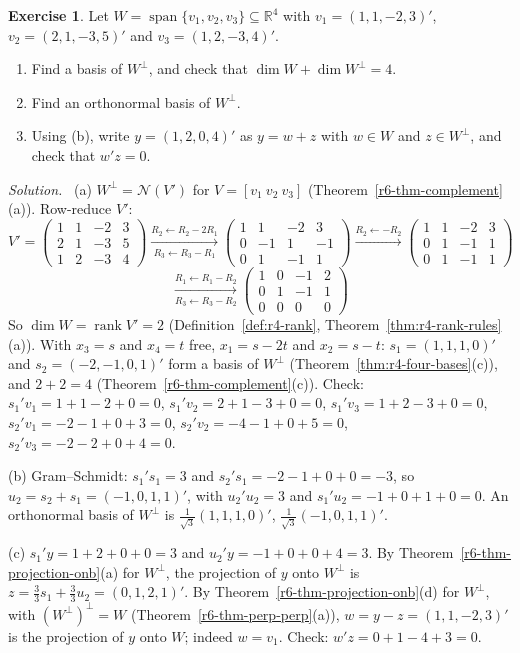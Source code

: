 \documentclass[12pt]{article}
\newcommand{\R}{\mathbb R}
\DeclareMathOperator{\rank}{rank}
\DeclareMathOperator{\Span}{span}
\theoremstyle{definition}
\newtheorem{exercise}{Exercise}
\newenvironment{solution}{\par\noindent\textit{Solution.}\ }{\par\smallskip}
\begin{document}
\begin{exercise}\label{r6-dr-complement}
Let \(W=\Span\{v_1,v_2,v_3\}\subseteq\R^4\) with \(v_1=(1,1,-2,3)'\), \(v_2=(2,1,-3,5)'\) and \(v_3=(1,2,-3,4)'\).
\begin{enumerate}
\item Find a basis of \(W^\perp\), and check that \(\dim W+\dim W^\perp=4\).
\item Find an orthonormal basis of \(W^\perp\).
\item Using (b), write \(y=(1,2,0,4)'\) as \(y=w+z\) with \(w\in W\) and \(z\in W^\perp\), and check that
\(w'z=0\).
\end{enumerate}
\end{exercise}
\begin{solution}
(a) \(W^\perp=\mathcal N(V')\) for \(V=[v_1\ v_2\ v_3]\) (Theorem~\ref{r6-thm-complement}(a)). Row-reduce \(V'\):
\[
V'=\begin{pmatrix}1&1&-2&3\\2&1&-3&5\\1&2&-3&4\end{pmatrix}
\xrightarrow[R_3\leftarrow R_3-R_1]{R_2\leftarrow R_2-2R_1}
\begin{pmatrix}1&1&-2&3\\0&-1&1&-1\\0&1&-1&1\end{pmatrix}
\xrightarrow{R_2\leftarrow-R_2}
\begin{pmatrix}1&1&-2&3\\0&1&-1&1\\0&1&-1&1\end{pmatrix}
\]
\[
\xrightarrow[R_3\leftarrow R_3-R_2]{R_1\leftarrow R_1-R_2}
\begin{pmatrix}1&0&-1&2\\0&1&-1&1\\0&0&0&0\end{pmatrix}
\]
So \(\dim W=\rank V'=2\) (Definition~\ref{def:r4-rank}, Theorem~\ref{thm:r4-rank-rules}(a)). With \(x_3=s\) and
\(x_4=t\) free, \(x_1=s-2t\) and \(x_2=s-t\): \(s_1=(1,1,1,0)'\) and \(s_2=(-2,-1,0,1)'\) form a basis of \(W^\perp\)
(Theorem~\ref{thm:r4-four-bases}(c)), and \(2+2=4\) (Theorem~\ref{r6-thm-complement}(c)). Check:
\(s_1'v_1=1+1-2+0=0\), \(s_1'v_2=2+1-3+0=0\), \(s_1'v_3=1+2-3+0=0\), \(s_2'v_1=-2-1+0+3=0\), \(s_2'v_2=-4-1+0+5=0\),
\(s_2'v_3=-2-2+0+4=0\).

(b) Gram--Schmidt: \(s_1's_1=3\) and \(s_2's_1=-2-1+0+0=-3\), so \(u_2=s_2+s_1=(-1,0,1,1)'\), with
\(u_2'u_2=3\) and \(s_1'u_2=-1+0+1+0=0\). An orthonormal basis of \(W^\perp\) is
\(\frac1{\sqrt3}(1,1,1,0)'\), \(\frac1{\sqrt3}(-1,0,1,1)'\).

(c) \(s_1'y=1+2+0+0=3\) and \(u_2'y=-1+0+0+4=3\). By Theorem~\ref{r6-thm-projection-onb}(a) for \(W^\perp\), the
projection of \(y\) onto \(W^\perp\) is \(z=\frac33s_1+\frac33u_2=(0,1,2,1)'\). By
Theorem~\ref{r6-thm-projection-onb}(d) for \(W^\perp\), with \((W^\perp)^\perp=W\)
(Theorem~\ref{r6-thm-perp-perp}(a)), \(w=y-z=(1,1,-2,3)'\) is the projection of \(y\) onto \(W\); indeed \(w=v_1\).
Check: \(w'z=0+1-4+3=0\).
\end{solution}
\end{document}
